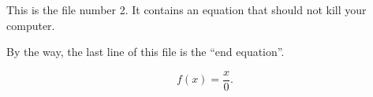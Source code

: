This is the file number 2. It contains an equation that should not kill your computer.

By the way, the last line of this file is the ``end equation''.

\begin{equation}
    f(x)=\frac{ x }{ 0 }.
\end{equation}%
